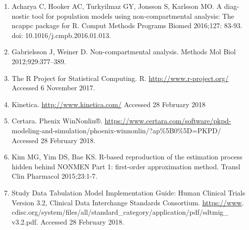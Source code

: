 \documentclass[12pt,]{krantz}
\providecommand{\tightlist}{%
  \setlength{\itemsep}{0pt}\setlength{\parskip}{0pt}}
\theoremstyle{definition}
\theoremstyle{definition}
\theoremstyle{definition}
\theoremstyle{remark}
\begin{document}
\begin{enumerate}
\def\labelenumi{\arabic{enumi}.}
\tightlist
\item
  Acharya C, Hooker AC, Turkyilmaz GY, Jonsson S, Karlsson MO. A diag-
  nostic tool for population models using non-compartmental analysis:
  The ncappc package for R. Comput Methods Programs Biomed 2016;127:
  83-93. doi: 10.1016/j.cmpb.2016.01.013.
\item
  Gabrielsson J, Weiner D. Non-compartmental analysis. Methods Mol Biol
  2012;929:377--389.
\item
  The R Project for Statistical Computing. R.
  \url{http://www.r-project.org/} Accessed 6 November 2017.
\item
  Kinetica. \url{http://www.kinetica.com/} Accessed 28 February 2018
\item
  Certara. Phenix WinNonlin®.
  \url{https://www.certara.com/software/pkpd-}
  modeling-and-simulation/phoenix-winnonlin/?ap\%5B0\%5D=PKPD/ Accessed
  28 February 2018.
\item
  Kim MG, Yim DS, Bae KS. R-based reproduction of the estimation process
  hidden behind NONMEN Part 1: first-order approximation method. Transl
  Clin Pharmacol 2015;23:1-7.
\item
  Study Data Tabulation Model Implementation Guide: Human Clinical
  Trials Version 3.2, Clinical Data Interchange Standards Consortium.
  \url{https://www}.
  cdisc.org/system/files/all/standard\_category/application/pdf/sdtmig\_
  v3.2.pdf. Accessed 28 February 2018.
\end{enumerate}


\end{document}
